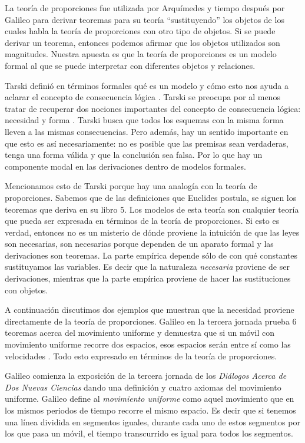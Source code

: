 La teoría de proporciones fue utilizada por Arquímedes y tiempo después por Galileo para derivar teoremas para su teoría ``sustituyendo'' los objetos de los cuales habla la teoría de proporciones con otro tipo de objetos. Si se puede derivar un teorema, entonces podemos afirmar que los objetos utilizados son magnitudes. Nuestra apuesta es que la teoría de proporciones es un modelo formal al que se puede interpretar con diferentes objetos y relaciones.

Tarski definió en términos formales qué es un modelo y cómo esto nos ayuda a aclarar el concepto de consecuencia lógica \cite{Tarski1956}. Tarski se preocupa por al menos tratar de recuperar dos nociones importantes del concepto de consecuencia lógica: necesidad y forma \cite{Torrente2000}. Tarski busca que todos los esquemas con la misma forma lleven a las mismas consecuencias. Pero además, hay un sentido importante en que esto es así necesariamente: no es posible que las premisas sean verdaderas, tenga una forma válida y que la conclusión sea falsa. Por lo que hay un componente modal en las derivaciones dentro de modelos formales.

Mencionamos esto de Tarski porque hay una analogía con la teoría de proporciones. Sabemos que de las definiciones que Euclides postula, se siguen los teoremas que deriva en su libro 5. Los modelos de esta teoría son cualquier teoría que pueda ser expresada en términos de la teoría de proporciones. Si esto es verdad, entonces no es un misterio de dónde proviene la intuición de que las leyes son necesarias, son necesarias porque dependen de un aparato formal y las derivaciones son teoremas. La parte empírica depende sólo de con qué constantes sustituyamos las variables. Es decir que la naturaleza \emph{necesaria} proviene de ser derivaciones, mientras que la parte empírica proviene de hacer las sustituciones con objetos.

A continuación discutimos dos ejemplos que muestran que la necesidad proviene directamente de la teoría de proporciones. Galileo en la tercera jornada prueba 6 teoremas acerca del movimiento uniforme y demuestra que si un móvil con movimiento uniforme recorre dos espacios, esos espacios serán entre sí como las velocidades \cite[p. 215]{galtre}. Todo esto expresado en términos de la teoría de proporciones.

Galileo comienza la exposición de la tercera jornada de los \emph{Diálogos Acerca de Dos Nuevas Ciencias} dando una definición y cuatro axiomas del movimiento uniforme. Galileo define al \textit{movimiento uniforme} como aquel movimiento que en los mismos periodos de tiempo recorre el mismo espacio. Es decir que si tenemos una línea dividida en segmentos iguales, durante cada uno de estos segmentos por los que pasa un móvil, el tiempo transcurrido es igual para todos los segmentos.

